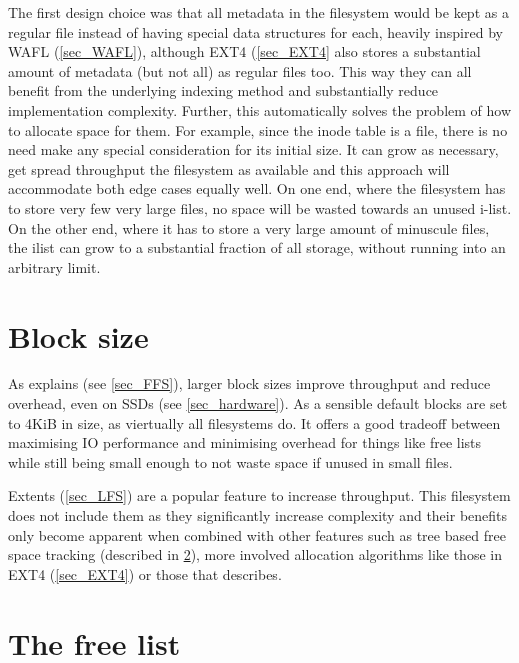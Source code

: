         The first design choice was that all metadata in the filesystem would
        be kept as a regular file instead of having special data structures for
        each, heavily inspired by WAFL (\ref{sec_WAFL}), although EXT4
        (\ref{sec_EXT4} also stores a substantial amount of metadata (but not
        all) as regular files too. This way they can all benefit from the
        underlying indexing method and substantially reduce implementation
        complexity. Further, this automatically solves the problem of how to
        allocate space for them.  For example, since the inode table is a file,
        there is no need make any special consideration for its initial size.
        It can grow as necessary, get spread throughput the filesystem as
        available and this approach will accommodate both edge cases equally
        well. On one end, where the filesystem has to store very few very large
        files, no space will be wasted towards an unused i-list. On the other
        end, where it has to store a very large amount of minuscule files, the
        ilist can grow to a substantial fraction of all storage, without
        running into an arbitrary limit.

    \section{Block size}
        \label{sec_block_size}

        As \citeauthor{FFS} explains (see \ref{sec_FFS}), larger block sizes
        improve throughput and reduce overhead, even on SSDs (see
        \ref{sec_hardware}). As a sensible default blocks are set to 4KiB in
        size, as viertually all filesystems do. It offers a good tradeoff
        between maximising IO performance and minimising overhead for things
        like free lists while still being small enough to not waste space if
        unused in small files.

        Extents (\ref{sec_LFS}) are a popular feature to increase throughput.
        This filesystem does not include them as they significantly increase
        complexity and their benefits only become apparent when combined with
        other features such as tree based free space tracking (described in
        \ref{sec_free_list}), more involved allocation algorithms like those in
        EXT4 (\ref{sec_EXT4}) or those that \citeauthor{ext4_space_maps}
        describes.

    \section{The free list}
        \label{sec_free_list}

